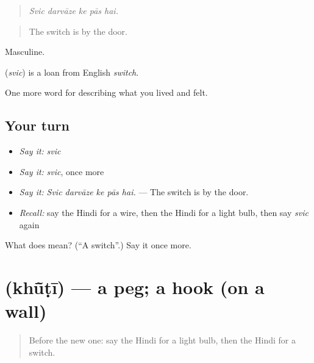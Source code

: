 \begin{quote}
    
\end{quote}

\begin{quote}
\emph{Svic darvāze ke pās hai.}
\end{quote}

\begin{quote}
The switch is by the door.
\end{quote}

Masculine.

\begin{cousinweb}
\textbf{} (\emph{svic}) is a loan from English \emph{switch}.
\end{cousinweb}

\begin{grammarlens}[title={What you've built}]
One more word for describing what you lived and felt.
\end{grammarlens}

\subsection*{Your turn}
\begin{itemize}
\raggedright
  \item \emph{Say it:} \emph{svic}
  \item \emph{Say it:} \emph{svic}, once more
  \item \emph{Say it:} \emph{Svic darvāze ke pās hai.} — The switch is by the door.
  \item \emph{Recall:} say the Hindi for a wire, then the Hindi for a light bulb, then say \emph{svic} again
\end{itemize}

\begin{tcolorbox}[breakable,colback=teal!4,colframe=teal!35!black,title={Before you move on}]
What does  mean? (\textquotedblleft{}A switch\textquotedblright{}.) Say it once more.
\end{tcolorbox}
\section[\texorpdfstring{\hi{खूँटी} (khū̃ṭī)}{खूँटी (khū̃ṭī)}]{ (khū̃ṭī) — a peg; a hook (on a wall)}

\label{lesson:HI-C518-khuti}



\begin{quote}
Before the new one: say the Hindi for a light bulb, then the Hindi for a switch.
\end{quote}

